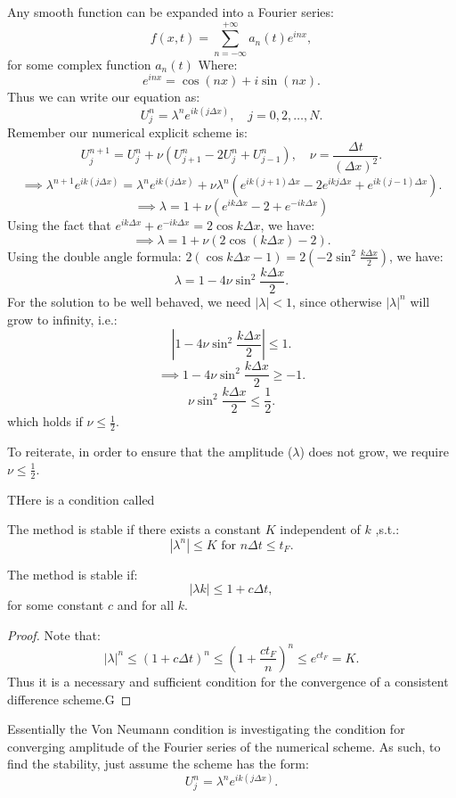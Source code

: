 \documentclass[../main/main.tex]{subfiles}
\begin{document}
Any smooth function can be expanded into a Fourier series: \[
    f(x,t) = \sum_{n=-\infty}^{+\infty} a_n(t) e^{inx}
    ,\] for some complex function $a_n(t)$ Where: \[
e^{inx} = \cos (nx) + i \sin(nx)
.\]
Thus we can write our equation as: \[
    U^n_j = \lambda^n e^{ik(j \Delta x)}, \quad j = 0,2,\ldots,N
.\] 
Remember our numerical explicit scheme is: \[
    U^{n+1}_j = U^n_j + \nu(U^n_{j+1}-2U^n_j+U^n_{j-1}), \quad \nu  = \frac{\Delta t}{(\Delta x)^2}
.\] \[
\implies \lambda^{n+1} e^{ik(j \Delta x)} = \lambda^n e^{ik(j\Delta x)} + \nu \lambda^n \left( e^{ik(j+1)\Delta x}-2 e^{ikj\Delta x} +e^{ik(j-1) \Delta x}\right) 
.\] \[
\implies \lambda = 1 + \nu\left( e^{ik\Delta x}-2 + e^{-ik\Delta x} \right) \]
Using the fact that $e^{ik\Delta x} + e^{-ik\Delta x} = 2\cos k\Delta x$, we have: 
\[\implies \lambda = 1 + \nu \left( 2\cos(k\Delta x) -2 \right) 
.\] Using the double angle formula: $2(\cos k\Delta x -1) = 2(-2 \sin^2 \frac{k\Delta x}{2})$, we have: \[
\lambda = 1-4\nu \sin^2 \frac{k\Delta x}{2}
.\] 
For the solution to be well behaved, we need $|\lambda| <  1$, since otherwise $|\lambda|^{n}$ will grow to infinity, i.e.: \[
\left|1-4\nu \sin^2 \frac{k\Delta x}{2}\right| \le  1
.\] \[
 \implies 1 - 4 \nu \sin^2 \frac{k\Delta x}{2} \ge -1
.\] \[
\nu \sin^2 \frac{k\Delta x}{2} \le  \frac{1}{2}
.\] which holds if $\nu\le  \frac{1}{2}$.

To reiterate, in order to ensure that the amplitude ($\lambda$) does not grow, we require $\nu \le  \frac{1}{2}$.

THere is a condition called 

The method is stable if there exists a constant  $K$ independent of  $k$ ,s.t.:  \[
|\lambda^{n}| \le  K \text{ for }n \Delta t \le  t_F
.\] 

\begin{definition} The method is stable if: \[
|\lambda k| \le  1 + c\Delta t 
,\] for some constant $c$ and for all  $k$. 
\end{definition}
\begin{proof}
    Note that: \[
        |\lambda|^{n} \le  (1+c\Delta t)^{n} \le  \left( 1+ \frac{ct_F}{n} \right) ^{n} \le e^{ct_F} = K
    .\] 
    Thus it is a necessary and sufficient condition for the convergence of a consistent difference scheme.G
\end{proof}

Essentially the Von Neumann condition is investigating the condition for converging amplitude of the Fourier series of the numerical scheme. As such, to find the stability, just assume the scheme has the form: \[
    U^n_j = \lambda^n e^{ik(j\Delta x)}
.\] 
\end{document}
